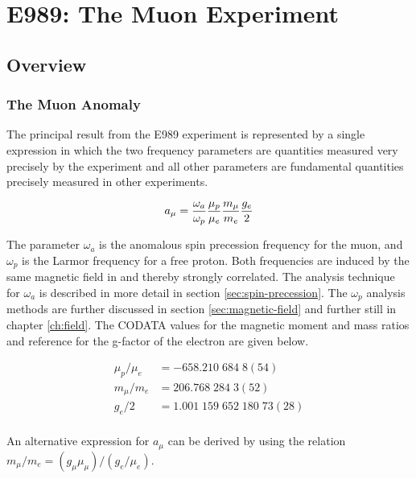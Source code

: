 \chapter {E989: The Muon \gmtwo Experiment} \label{ch:expt}

\section{Overview} \label{sec:expt-overview}

\subsection{The Muon Anomaly}

The principal result from the E989 experiment is represented by a single expression in which the two frequency parameters are quantities measured very precisely by the \mugmtwo experiment and all other parameters are fundamental quantities precisely measured in other experiments.

\begin{equation}
\label{eqn:g-2-result-1}
a_\mu = \frac{\omega_a}{\omega_p} \frac{\mu_p}{\mu_e} \\
\frac{m_\mu}{m_e} \frac{g_e}{2}
\end{equation}

\noindent
The parameter $\omega_a$ is the anomalous spin precession frequency for the muon, and $\omega_p$ is the Larmor frequency for a free proton.  Both frequencies are induced by the same magnetic field in \mugmtwo and thereby strongly correlated. The analysis technique for $\omega_a$ is described in more detail in section \ref{sec:spin-precession}.  The $\omega_p$ analysis methods are further discussed in section \ref{sec:magnetic-field} and further still in chapter \ref{ch:field}.  The CODATA values \cite{codata} for the magnetic moment and mass ratios and reference \cite{g-e-measurement} for the g-factor of the electron are given below.

\begin{align}
\mu_p/\mu_e & = -658.210\;684\;8(54) \\
m_\mu/m_e & = 206.768\;284\;3(52) \\
g_e/2 & = 1.001\;159\;652\;180\;73(28) \\
\end{align}

An alternative expression for $a_\mu$ can be derived by using the relation $m_\mu / m_e = (g_\mu \mu_\mu) / (g_e / \mu_e)$.  

